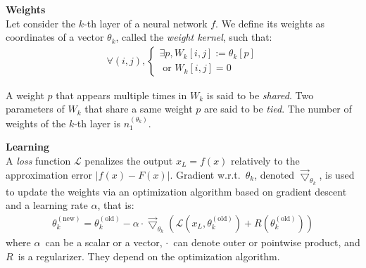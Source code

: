 \begin{definition}\textbf{Weights}\\
Let consider the $k$-th layer of a neural network $f$. We define its weights as coordinates of a vector $\theta_k$, called the \emph{weight kernel}, such that:
\begin{gather*}
  \forall (i,j),
    \begin{cases}
      \exists p, W_k[i,j] := \theta_k[p] \\
      \text{ or } W_k[i,j] = 0
    \end{cases}
\end{gather*}
\end{definition}
A weight $p$ that appears multiple times in $W_k$ is said to be \emph{shared}. Two parameters of $W_k$ that share a same weight $p$ are said to be \emph{tied}. The number of weights of the $k$-th layer is $n_1^{(\theta_k)}$.

\begin{remark}\textbf{Learning}\\
A \emph{loss} function $\mathcal{L}$ penalizes the output $x_L = f(x)$ relatively to the approximation error $|f(x) - F(x)|$. Gradient w.r.t.~$\theta_k$, denoted $\vec{\bigtriangledown}_{\theta_k}$, is used to update the weights via an optimization algorithm based on gradient descent and a learning rate $\alpha$, that is:
\begin{gather}
\theta_k^{(\text{new})} = \theta_k^{(\text{old})} - \alpha \cdot \vec{\bigtriangledown}_{\theta_k} \left( \mathcal{L}\left( x_L, \theta_k^{(\text{old})} \right) + R\left( \theta_k^{(\text{old})} \right) \right)
\end{gather}
where $\alpha$~can be a scalar or a vector, $\cdot$~can denote outer or pointwise product, and $R$~is a regularizer. They depend on the optimization algorithm.
\end{remark}


